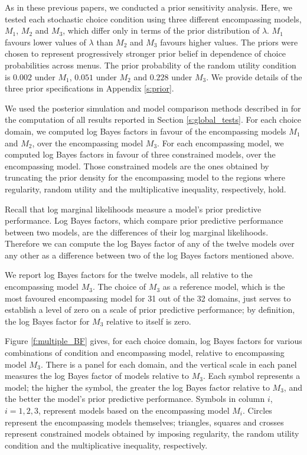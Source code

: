 \documentclass[11pt,letter]{article}
\newcommand{\menus}{menus}
\begin{document}
As in these previous papers, we conducted a prior sensitivity analysis.
Here, we tested each stochastic choice condition using three different encompassing models, $M_1$, $M_2$ and $M_3$, which differ only in terms of the prior distribution of $\lambda$.
$M_1$ favours lower values of $\lambda$ than $M_2$ and $M_3$ favours higher values.
The priors were chosen to represent progressively stronger prior belief in dependence of choice probabilities across \menus{}.
The prior probability of the random utility condition is $0.002$ under $M_1$, $0.051$ under $M_2$ and $0.228$ under $M_3$.
We provide details of the three prior specifications in Appendix \ref{s:prior}.

We used the posterior simulation and model comparison methods described in \citet{McCaMarl14} for the computation of all results reported in Section \ref{s:global_tests}.
For each choice domain, we computed log Bayes factors in favour of the encompassing models $M_1$ and $M_2$, over the encompassing model $M_3$.
For each encompassing model, we computed log Bayes factors in favour of three constrained models, over the encompassing model.
Those constrained models are the ones obtained by truncating the prior density for the encompassing model to the regions where regularity, random utility and the multiplicative inequality, respectively, hold.

Recall that log marginal likelihoods measure a model's prior predictive performance.
Log Bayes factors, which compare prior predictive performance between two models, are the differences of their log marginal likelihoods.
Therefore we can compute the log Bayes factor of any of the twelve models over any other as a difference between two of the log Bayes factors mentioned above.

We report log Bayes factors for the twelve models, all relative to the encompassing model $M_3$.
The choice of $M_3$ as a reference model, which is the most favoured encompassing model for 31 out of the 32 domains, just serves to establish a level of zero on a scale of prior predictive performance; by definition, the log Bayes factor for $M_3$ relative to itself is zero.

Figure \ref{f:multiple_BF} gives, for each choice domain, log Bayes factors for various combinations of condition and encompassing model, relative to encompassing model $M_3$.
There is a panel for each domain, and the vertical scale in each panel measures the log Bayes factor of models relative to $M_3$.
Each symbol represents a model; the higher the symbol, the greater the log Bayes factor relative to $M_3$, and the better the model's prior predictive performance.
Symbols in column $i$, $i=1,2,3$, represent models based on the encompassing model $M_i$.
Circles represent the encompassing models themselves; triangles, squares and crosses represent constrained models obtained by imposing regularity, the random utility condition and the multiplicative inequality, respectively.
\end{document}
